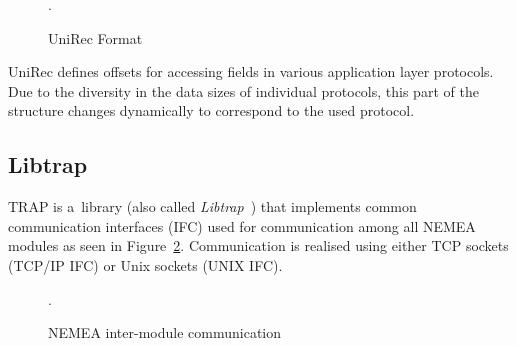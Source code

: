 \begin{figure}[H]
   \begin{center}
		 \hfill
      \caption{UniRec Format} \label{fig:unirec}.
	\end{center}
\end{figure}

UniRec defines offsets for accessing fields in
various application layer protocols. Due to the diversity in the data sizes of individual protocols, this part
of the structure changes dynamically to correspond to the used protocol.

\subsection{Libtrap}\label{sec:libtrap}

TRAP is a~library (also called \textit{Libtrap}~\cite{libtrap}) that implements
common communication interfaces (IFC) used for communication among all NEMEA modules
as seen in Figure~\ref{fig:libtrap}. Communication is realised using either
TCP sockets (TCP/IP IFC) or Unix sockets (UNIX IFC).


\begin{figure}[H]
   \begin{center}
		 \hfill
      \caption{NEMEA inter-module communication} \label{fig:libtrap}.
	\end{center}
\end{figure}

